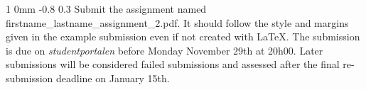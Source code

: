 \documentclass[11pt]{article}
\makeatletter
\renewcommand{\section}{\@startsection
{section}%
{1}%
{0mm}%
{-0.8\baselineskip}%
{0.3\baselineskip}%
{\bfseries\large}}%
\makeatother
\begin{document}
\section{Submit the assignment}
\noindent
named firstname\_lastname\_assignment\_2.pdf. It should follow the
style and margins given in the example submission even if not created
with LaTeX. The submission is due on \textit{studentportalen} before
Monday November 29th at 20h00. Later submissions will be considered
failed submissions and assessed after the final re-submission deadline
on January 15th.
\end{document}
